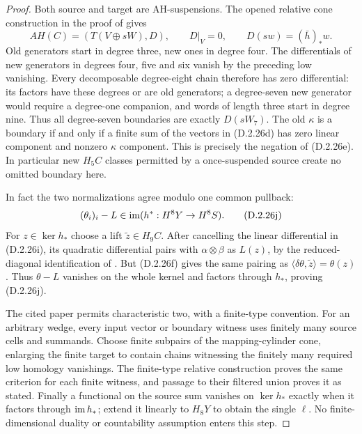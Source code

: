 \begin{proof}
Both source and target are AH-suspensions. The opened relative
cone construction in the proof of
\cite[Proposition 7.4, p.309]{FGHHalperinLemaire1995} gives
\[
 AH(C)=(T(V\oplus sW),D),\qquad
 D|_V=0,\qquad D(sw)=(\bar h)_*w.
 \tag{D.2.26i}
\]
Old generators start in degree three, new ones in degree four.
The differentials of new generators in degrees four, five and
six vanish by the preceding low vanishing. Every decomposable
degree-eight chain therefore has zero differential: its factors
have these degrees or are old generators; a degree-seven new
generator would require a degree-one companion, and words of
length three start in degree nine. Thus all degree-seven
boundaries are exactly $D(sW_7)$. The old $\kappa$ is a boundary
if and only if a finite sum of the vectors in
\textup{(D.2.26d)} has zero linear component and nonzero
$\kappa$ component. This is precisely the negation of
\textup{(D.2.26e)}. In particular new $H_5C$ classes permitted
by a once-suspended source create no omitted boundary here.

In fact the two normalizations agree modulo one common pullback:
\[
 (\theta_i)_i-L\in\operatorname{im}(h^*:H^8Y\to H^8S).
 \tag{D.2.26j}
\]
For $z\in\ker h_*$ choose a lift $\widetilde z\in H_9C$.
After cancelling the linear differential in
\textup{(D.2.26i)}, its quadratic differential pairs with
$\alpha\otimes\beta$ as $L(z)$, by the reduced-diagonal
identification of \cite[\S3.1]{FGHHalperinLemaire1995}.
But \textup{(D.2.26f)} gives the same pairing as
$\langle\delta\theta,\widetilde z\rangle=\theta(z)$.
Thus $\theta-L$ vanishes on the whole kernel and factors
through $h_*$, proving \textup{(D.2.26j)}.

The cited paper permits characteristic two, with a finite-type
convention. For an arbitrary wedge, every input vector or
boundary witness uses finitely many source cells and summands.
Choose finite subpairs of the mapping-cylinder cone, enlarging
the finite target to contain chains witnessing the finitely many
required low homology vanishings. The finite-type relative
construction proves the same criterion for each finite witness,
and passage to their filtered union proves it as stated.
Finally a functional on the source sum vanishes on $\ker h_*$
exactly when it factors through $\operatorname{im} h_*$; extend it linearly to
$H_8Y$ to obtain the single $\ell$. No finite-dimensional duality
or countability assumption enters this step.
\end{proof}

